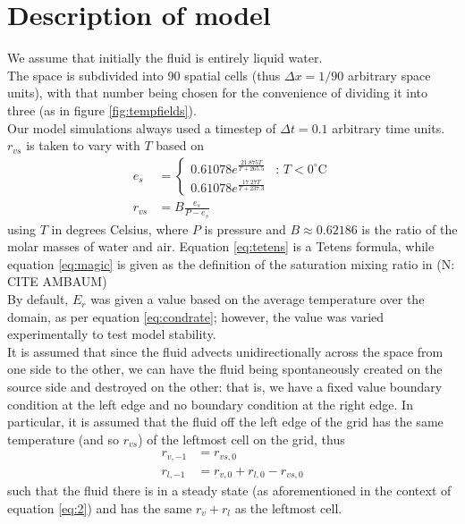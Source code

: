 \documentclass[11pt]{article}
\begin{document}
\section{Description of model}
We assume that initially the fluid is entirely liquid water. \\
The space is subdivided into 90 spatial cells (thus $\Delta x=1/90$ arbitrary space units), with that number being chosen for the convenience of dividing it into three (as in figure \ref{fig:tempfields}). \\
Our model simulations always used a timestep of $\Delta t=0.1$ arbitrary time units. \\
$r_{vs}$ is taken to vary with $T$ based on
\begin{align}
e_s &= \begin{cases}
0.61078 e^{\frac{21.875T}{T+265.5}} & \text{: $T<0^{\circ}$C} \\
0.61078 e^{\frac{17.27T}{T+237.3}} &
\end{cases} \label{eq:tetens} \\
r_{vs} &= B\frac{e_s}{P-e_s} \label{eq:magic}
\end{align}
using $T$ in degrees Celsius, where $P$ is pressure and $B\approx0.62186$ is the ratio of the molar masses of water and air. Equation \ref{eq:tetens} is a Tetens formula, while equation \ref{eq:magic} is given as the definition of the saturation mixing ratio in (N: CITE AMBAUM) \\
By default, $E_r$ was given a value based on the average temperature over the domain, as per equation \ref{eq:condrate}; however, the value was varied experimentally to test model stability. \\
It is assumed that since the fluid advects unidirectionally across the space from one side to the other, we can have the fluid being spontaneously created on the source side and destroyed on the other: that is, we have a fixed value boundary condition at the left edge and no boundary condition at the right edge. In particular, it is assumed that the fluid off the left edge of the grid has the same temperature (and so $r_{vs}$) of the leftmost cell on the grid, thus
\begin{align}
r_{v,-1} &= r_{vs,0} \label{eq:a} \\
r_{l,-1} &= r_{v,0}+r_{l,0}-r_{vs,0} \label{eq:b}
\end{align}
such that the fluid there is in a steady state (as aforementioned in the context of equation \ref{eq:2}) and has the same $r_v+r_l$ as the leftmost cell. \\
\end{document}
